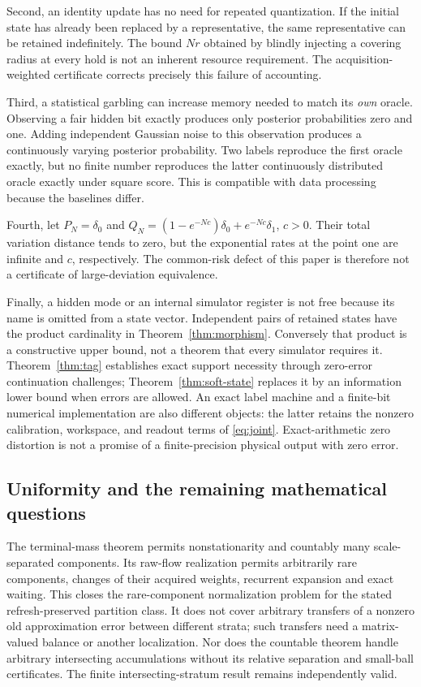 Second, an identity update has no need for repeated quantization. If the initial state has already been replaced by a representative, the same representative can be retained indefinitely. The bound $Nr$ obtained by blindly injecting a covering radius at every hold is not an inherent resource requirement. The acquisition-weighted certificate corrects precisely this failure of accounting.

Third, a statistical garbling can increase memory needed to match its \emph{own} oracle. Observing a fair hidden bit exactly produces only posterior probabilities zero and one. Adding independent Gaussian noise to this observation produces a continuously varying posterior probability. Two labels reproduce the first oracle exactly, but no finite number reproduces the latter continuously distributed oracle exactly under square score. This is compatible with data processing because the baselines differ.

Fourth, let $P_N=\delta_0$ and $Q_N=(1-e^{-Nc})\delta_0+e^{-Nc}\delta_1$, $c>0$. Their total variation distance tends to zero, but the exponential rates at the point one are infinite and $c$, respectively. The common-risk defect of this paper is therefore not a certificate of large-deviation equivalence.

Finally, a hidden mode or an internal simulator register is not free because its name is omitted from a state vector. Independent pairs of retained states have the product cardinality in Theorem~\ref{thm:morphism}. Conversely that product is a constructive upper bound, not a theorem that every simulator requires it. Theorem~\ref{thm:tag} establishes exact support necessity through zero-error continuation challenges; Theorem~\ref{thm:soft-state} replaces it by an information lower bound when errors are allowed. An exact label machine and a finite-bit numerical implementation are also different objects: the latter retains the nonzero calibration, workspace, and readout terms of \eqref{eq:joint}. Exact-arithmetic zero distortion is not a promise of a finite-precision physical output with zero error.


\subsection{Uniformity and the remaining mathematical questions}
The terminal-mass theorem permits nonstationarity and countably many scale-separated components. Its raw-flow realization permits arbitrarily rare components, changes of their acquired weights, recurrent expansion and exact waiting. This closes the rare-component normalization problem for the stated refresh-preserved partition class. It does not cover arbitrary transfers of a nonzero old approximation error between different strata; such transfers need a matrix-valued balance or another localization. Nor does the countable theorem handle arbitrary intersecting accumulations without its relative separation and small-ball certificates. The finite intersecting-stratum result remains independently valid.

